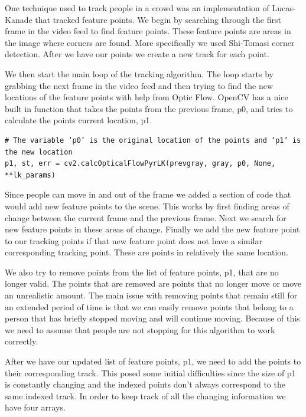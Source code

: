 \documentclass[12pt, onecolumn, conference]{IEEEtran}
\begin{document}
One technique used to track people in a crowd was an implementation of Lucas-Kanade that tracked feature points. We begin by searching through the first frame in the video feed to find feature points. These feature points are areas in the image where corners are found. More specifically we used Shi-Tomasi corner detection. After we have our points we create a new track for each point.

We then start the main loop of the tracking algorithm. The loop starts by grabbing the next frame in the video feed and then trying to find the new locations of the feature points with help from Optic Flow. OpenCV has a nice built in function that takes the points from the previous frame, p0, and tries to calculate the points current location, p1.

\begin{lstlisting}
# The variable ‘p0’ is the original location of the points and ‘p1’ is the new location
p1, st, err = cv2.calcOpticalFlowPyrLK(prevgray, gray, p0, None, **lk_params)
\end{lstlisting}

Since people can move in and out of the frame we added a section of code that would add new feature points to the scene. This works by first finding areas of change between the current frame and the previous frame. Next we search for new feature points in these areas of change. Finally we add the new feature point to our tracking points if that new feature point does not have a similar corresponding tracking point. These are points in relatively the same location.

We also try to remove points from the list of feature points, p1, that are no longer valid. The points that are removed are points that no longer move or move an unrealistic amount. The main issue with removing points that remain still for an extended period of time is that we can easily remove points that belong to a person that has briefly stopped moving and will continue moving. Because of this we need to assume that people are not stopping for this algorithm to work correctly.

After we have our updated list of feature points, p1, we need to add the points to their corresponding track. This posed some initial difficulties since the size of p1 is constantly changing and the indexed points don’t always correspond to the same indexed track. In order to keep track of all the changing information we have four arrays.
\end{document}
